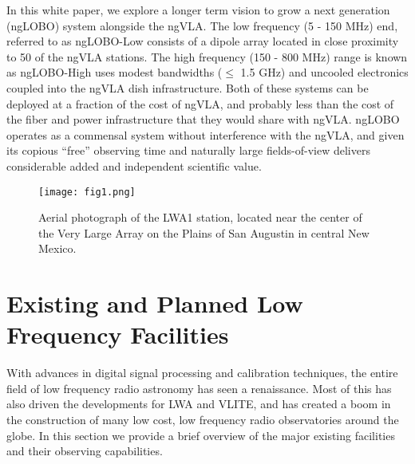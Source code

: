 \documentclass[11pt]{article}
\begin{document}
In this white paper, we explore a longer term vision to grow a next generation (ngLOBO) system alongside the ngVLA. The low frequency (5 - 150 MHz) end, referred to as ngLOBO-Low consists of a dipole array located in close proximity to 50 of the ngVLA stations.  The high frequency (150 - 800 MHz) range is known as ngLOBO-High uses modest bandwidths ($\leq$ 1.5 GHz) and uncooled electronics coupled into the ngVLA dish infrastructure.  Both of these systems can be deployed at a fraction of the cost of ngVLA, and probably less than the cost of the fiber and power infrastructure that they would share with ngVLA. ngLOBO operates as a commensal system without interference with the ngVLA, and given its copious ``free'' observing time and naturally large fields-of-view delivers considerable added and independent scientific value. 

\begin{figure}[t!]
\begin{center}
\vspace{-1cm}
\texttt{[image: fig1.png]}
\end{center}
\vspace{-0.5cm}
  \caption{
Aerial photograph of the LWA1 station, located near the center of
the Very Large Array on the Plains of San Augustin in central
New Mexico.
}
\label{lwa1}
\end{figure}

\vspace{-0.5cm}
\section{Existing and Planned Low Frequency Facilities}
\vspace{-0.25cm}

With advances in digital signal processing and calibration techniques, the entire field of low frequency radio astronomy has seen a renaissance. Most of this has also driven the developments for LWA and VLITE, and has created a boom in the construction of many low cost, low frequency radio observatories around the globe. In this section we provide a brief overview of the major existing facilities and their observing capabilities. 
\end{document}
